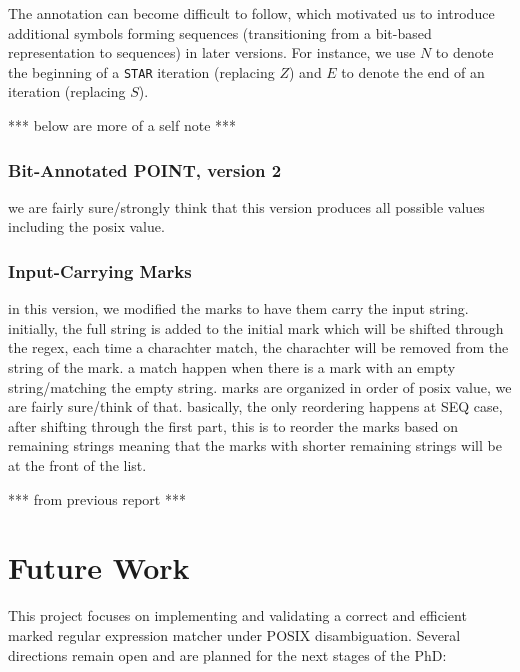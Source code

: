 \documentclass[12pt]{article}
\begin{document}
The annotation can become difficult to follow, which motivated us to introduce additional symbols forming sequences
 (transitioning from a bit-based representation to sequences) in later versions. For instance, we use $N$ to denote 
 the beginning of a \texttt{STAR} iteration (replacing $Z$) and $E$ to denote the end of an iteration (replacing $S$).

 \newpage

*** below are more of a self note ***
\subsubsection{Bit-Annotated POINT, version 2}
we are fairly sure/strongly think that this version produces all possible values including the posix value.
\subsubsection{Input-Carrying Marks}
in this version, we modified the marks to have them carry the input string. initially, the full string is added to
the initial mark which will be shifted through the regex, each time a charachter match, the charachter will be removed
from the string of the mark. a match happen when there is a mark with an empty string/matching the empty string.
marks are organized in order of posix value, we are fairly sure/think of that. basically, the only reordering happens at
SEQ case, after shifting through the first part, this is to reorder the marks based on remaining strings meaning that
the marks with shorter remaining strings will be at the front of the list.

*** from previous report ***
\section{Future Work}
This project focuses on implementing and validating a correct and efficient marked regular expression matcher under POSIX disambiguation. Several directions remain open and are planned for the next stages of the PhD:
\end{document}
